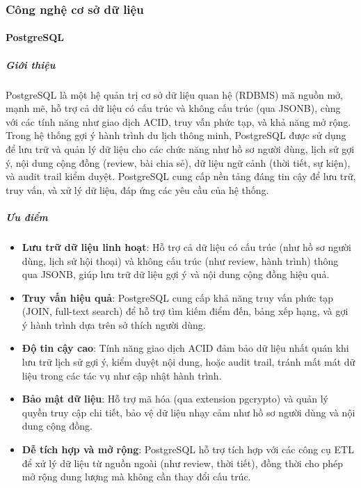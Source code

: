 
\subsubsection{Công nghệ cơ sở dữ liệu}

\paragraph{PostgreSQL}

\subparagraph{Giới thiệu}
PostgreSQL là một hệ quản trị cơ sở dữ liệu quan hệ (RDBMS) mã nguồn mở, mạnh mẽ, hỗ trợ cả dữ liệu có cấu trúc và không cấu trúc (qua JSONB), cùng với các tính năng như giao dịch ACID, truy vấn phức tạp, và khả năng mở rộng. Trong hệ thống gợi ý hành trình du lịch thông minh, PostgreSQL được sử dụng để lưu trữ và quản lý dữ liệu cho các chức năng như hồ sơ người dùng, lịch sử gợi ý, nội dung cộng đồng (review, bài chia sẻ), dữ liệu ngữ cảnh (thời tiết, sự kiện), và audit trail kiểm duyệt. PostgreSQL cung cấp nền tảng đáng tin cậy để lưu trữ, truy vấn, và xử lý dữ liệu, đáp ứng các yêu cầu của hệ thống.

\subparagraph{Ưu điểm}
\begin{itemize}
    \item \textbf{Lưu trữ dữ liệu linh hoạt}: Hỗ trợ cả dữ liệu có cấu trúc (như hồ sơ người dùng, lịch sử hội thoại) và không cấu trúc (như review, hành trình) thông qua JSONB, giúp lưu trữ dữ liệu gợi ý và nội dung cộng đồng hiệu quả.
    \item \textbf{Truy vấn hiệu quả}: PostgreSQL cung cấp khả năng truy vấn phức tạp (JOIN, full-text search) để hỗ trợ tìm kiếm điểm đến, bảng xếp hạng, và gợi ý hành trình dựa trên sở thích người dùng.
    \item \textbf{Độ tin cậy cao}: Tính năng giao dịch ACID đảm bảo dữ liệu nhất quán khi lưu trữ lịch sử gợi ý, kiểm duyệt nội dung, hoặc audit trail, tránh mất mát dữ liệu trong các tác vụ như cập nhật hành trình.
    \item \textbf{Bảo mật dữ liệu}: Hỗ trợ mã hóa (qua extension pgcrypto) và quản lý quyền truy cập chi tiết, bảo vệ dữ liệu nhạy cảm như hồ sơ người dùng và nội dung cộng đồng.
    \item \textbf{Dễ tích hợp và mở rộng}: PostgreSQL hỗ trợ tích hợp với các công cụ ETL để xử lý dữ liệu từ nguồn ngoài (như review, thời tiết), đồng thời cho phép mở rộng dung lượng mà không cần thay đổi cấu trúc.
\end{itemize}

